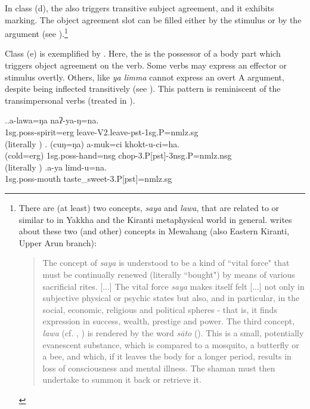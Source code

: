 In class (d), the  also triggers transitive subject agreement, and it exhibits  marking. The object agreement slot can be filled either by  the stimulus  or by the  argument (see \Next[a]).\footnote{There are (at least) two concepts, \emph{saya} and \emph{lawa}, that are related to or similar to  in Yakkha and the Kiranti metaphysical world in general.  \citet{Gaenszle2000Origins} writes about these two (and other) concepts in Mewahang (also Eastern Kiranti, Upper Arun branch): 

\begin{quote}
The concept of \emph{saya} is understood to be a kind of “vital force" that must be continually renewed (literally “bought") by means of various sacrificial rites. [...] The vital force \emph{saya} makes itself felt [...] not only in subjective physical or psychic states but also, and in particular, in the social, economic, religious and political spheres - that is, it finds expression in success, wealth, prestige and power. The third concept, \emph{lawa} (cf. \citet[165]{Hardman1981The-psychology}, \citealt[299]{Hardman_phd_Conformity}) is rendered by the  word \emph{sāto} (). This is a small, potentially evanescent substance, which is compared to a mosquito, a butterfly or a bee, and which, if it leaves the body for a longer period, results in loss of consciousness and mental illness. The shaman must then undertake to summon it back or retrieve it. \citep[119]{Gaenszle2000Origins} 
\end{quote}
}

Class (e) is exemplified by \Next[b]. Here, the  is the possessor of a body part  which triggers object agreement on the verb. Some verbs may express an effector or stimulus overtly. Others, like \emph{ya limma}  cannot express an overt A argument, despite being inflected transitively (see \Next[c]). This pattern is reminiscent of the transimpersonal verbs (treated in ).

 \ex.\ag.\label{ex-lawa}a-lawa=ŋa naʔ-ya-ŋ=na.\\
 {\sc 1sg.poss-}spirit{\sc =erg} leave{\sc -V2.leave-pst-1sg.P=nmlz.sg}\\
  (literally )
 \bg. (cuŋ=ŋa) a-muk=ci khokt-u-ci=ha.\\
 (cold{\sc =erg}) {\sc 1sg.poss-}hand{\sc =nsg} chop{\sc -3.P[pst]-3nsg.P=nmlz.nsg}\\
 (literally )
\bg.a-ya limd-u=na.\\
{\sc 1sg.poss-}mouth taste\_sweet{\sc -3.P[pst]=nmlz.sg}\\

